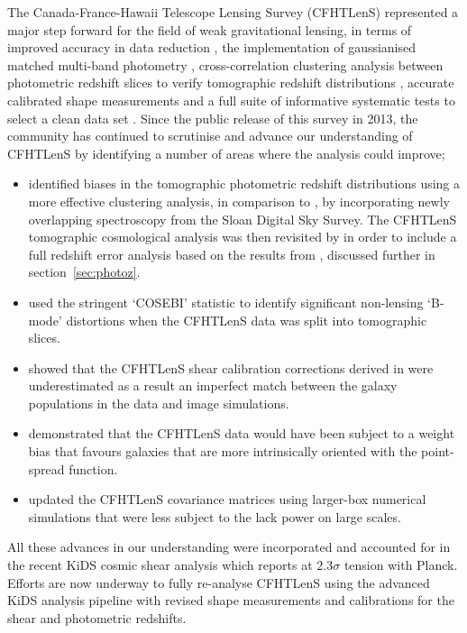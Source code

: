 The Canada-France-Hawaii Telescope Lensing Survey (CFHTLenS) represented a major step forward for the field of weak gravitational lensing, in terms of improved accuracy in data reduction \citep{erben/etal:2013}, the implementation of gaussianised matched multi-band photometry \citep{hildebrandt/etal:2012}, cross-correlation clustering analysis between photometric redshift slices to verify tomographic redshift distributions \citep{benjamin/etal:2013}, accurate calibrated shape measurements \citep{miller/etal:2013} and a full suite of informative systematic tests to select a clean data set \citep{heymans/etal:2012}.    Since the public release of this survey in 2013, the community has continued to scrutinise and advance our understanding of CFHTLenS by identifying a number of areas where the analysis could improve;
\begin{itemize}
\item{\citet{choi/etal:2016} identified biases in the tomographic photometric redshift distributions using a more effective clustering analysis, in comparison to \citet{benjamin/etal:2013}, by incorporating newly overlapping spectroscopy from the Sloan Digital Sky Survey.  The CFHTLenS tomographic cosmological analysis was then revisited by \citet{joudaki/etal:2016} in order to include a full redshift error analysis based on the results from \citet{choi/etal:2016}, discussed further in section~\ref{sec:photoz}.}
\item{\citet{asgari/etal:2016} used the stringent `COSEBI' statistic to identify significant non-lensing `B-mode' distortions when the CFHTLenS data was split into tomographic slices.}
\item{\citet{kuijken/etal:2015} showed that the CFHTLenS shear calibration corrections derived in \citet{miller/etal:2013} were underestimated as a result an imperfect match between the galaxy populations in the data and image simulations.}
\item{\citet{fenechconti/etal:2016} demonstrated that the CFHTLenS data would have been subject to a weight bias that favours galaxies that are more intrinsically oriented with the point-spread function.}
\item{\citet{joudaki/etal:2016} updated the CFHTLenS covariance matrices using larger-box numerical simulations that were less subject to the lack power on large scales.}
\end{itemize}
All these advances in our understanding were incorporated and accounted for in the recent KiDS cosmic shear analysis \citep{hildebrandt/etal:2016} which reports at $2.3 \sigma$ tension with Planck.  Efforts are now underway to fully re-analyse CFHTLenS using the advanced KiDS analysis pipeline with revised shape measurements and calibrations for the shear and photometric redshifts.  

